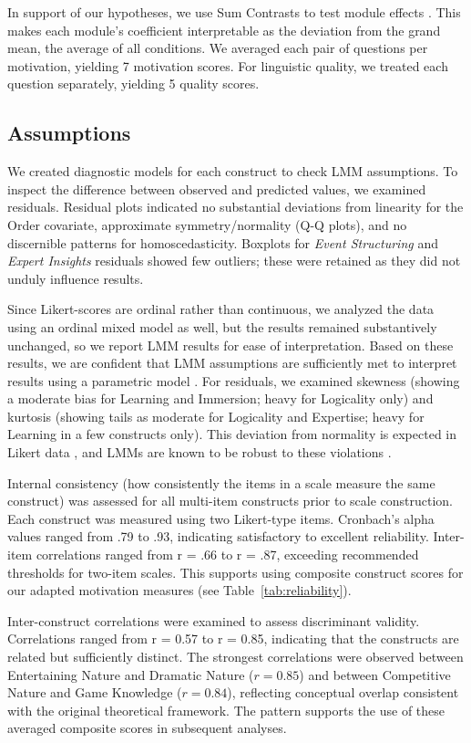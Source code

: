 In support of our hypotheses, we use Sum Contrasts to test module effects \cite{schad2020}. This makes each module's coefficient interpretable as the deviation from the grand mean, the average of all conditions. We averaged each pair of questions per motivation, yielding 7 motivation scores. For linguistic quality, we treated each question separately, yielding 5 quality scores.

\subsection{Assumptions}
We created diagnostic models for each construct to check LMM assumptions. To inspect the difference between observed and predicted values, we examined residuals. Residual plots indicated no substantial deviations from linearity for the Order covariate, approximate symmetry/normality (Q-Q plots), and no discernible patterns for homoscedasticity. Boxplots for \textit{Event Structuring} and \textit{Expert Insights} residuals showed few outliers; these were retained as they did not unduly influence results.

Since Likert-scores are ordinal rather than continuous, we analyzed the data using an ordinal mixed model as well, but the results remained substantively unchanged, so we report LMM results for ease of interpretation. Based on these results, we are confident that LMM assumptions are sufficiently met to interpret results using a parametric model \cite{norman2010}. For residuals, we examined skewness (showing a moderate bias for Learning and Immersion; heavy for Logicality only) and kurtosis (showing tails as moderate for Logicality and Expertise; heavy for Learning in a few constructs only). This deviation from normality is expected in Likert data \cite{norman2010}, and LMMs are known to be robust to these violations \cite{schielzeth2020}.

Internal consistency (how consistently the items in a scale measure the same construct) was assessed for all multi-item constructs prior to scale construction. Each construct was measured using two Likert-type items. Cronbach’s alpha values ranged from .79 to .93, indicating satisfactory to excellent reliability. Inter-item correlations ranged from r = .66 to r = .87, exceeding recommended thresholds for two-item scales. This supports using composite construct scores for our adapted motivation measures (see Table~\ref{tab:reliability}).

Inter-construct correlations were examined to assess discriminant validity. Correlations ranged from r = 0.57 to r = 0.85, indicating that the constructs are related but sufficiently distinct. The strongest correlations were observed between Entertaining Nature and Dramatic Nature ($r = 0.85$) and between Competitive Nature and Game Knowledge ($r = 0.84$), reflecting conceptual overlap consistent with the original theoretical framework. The pattern supports the use of these averaged composite scores in subsequent analyses.

